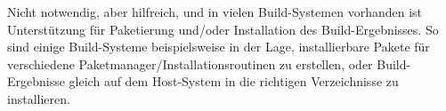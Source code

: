 Nicht notwendig, aber hilfreich, und in vielen Build-Systemen vorhanden ist
Unterstützung für Paketierung und/oder Installation des Build-Ergebnisses. So
sind einige Build-Systeme beispielsweise in der Lage, installierbare Pakete für
verschiedene Paketmanager/Installationsroutinen zu erstellen, oder
Build-Ergebnisse gleich auf dem Host-System in die richtigen Verzeichnisse zu
installieren.
